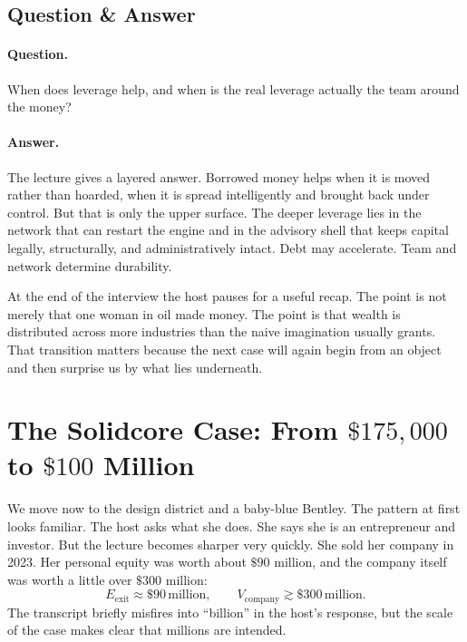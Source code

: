 \subsection{Question \& Answer}

\paragraph{Question.}
When does leverage help, and when is the real leverage actually the team around the money?

\paragraph{Answer.}
The lecture gives a layered answer. Borrowed money helps when it is moved rather than hoarded, when it is spread intelligently and brought back under control. But that is only the upper surface. The deeper leverage lies in the network that can restart the engine and in the advisory shell that keeps capital legally, structurally, and administratively intact. Debt may accelerate. Team and network determine durability.

At the end of the interview the host pauses for a useful recap. The point is not merely that one woman in oil made money. The point is that wealth is distributed across more industries than the naive imagination usually grants. That transition matters because the next case will again begin from an object and then surprise us by what lies underneath.

\section{The Solidcore Case: From \(\$175{,}000\) to \(\$100\) Million}

We move now to the design district and a baby-blue Bentley. The pattern at first looks familiar. The host asks what she does. She says she is an entrepreneur and investor. But the lecture becomes sharper very quickly. She sold her company in 2023. Her personal equity was worth about \(\$90\) million, and the company itself was worth a little over \(\$300\) million:
\begin{equation}
E_{\text{exit}} \approx \$90\,\text{million},
\qquad
V_{\text{company}} \gtrsim \$300\,\text{million}.
\end{equation}
The transcript briefly misfires into ``billion'' in the host's response, but the scale of the case makes clear that millions are intended.

